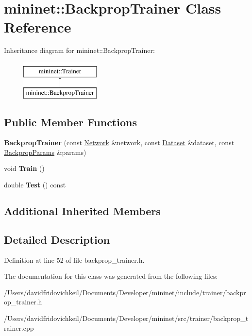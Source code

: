 \hypertarget{classmininet_1_1_backprop_trainer}{}\section{mininet\+:\+:Backprop\+Trainer Class Reference}
\label{classmininet_1_1_backprop_trainer}
Inheritance diagram for mininet\+:\+:Backprop\+Trainer\+:\begin{figure}[H]
\begin{center}
\leavevmode
\includegraphics[height=2.000000cm]{classmininet_1_1_backprop_trainer}
\end{center}
\end{figure}
\subsection*{Public Member Functions}
\begin{DoxyCompactItemize}
\item 
\hypertarget{classmininet_1_1_backprop_trainer_a8cbf43d95c557921f1240b89e44b2da8}{}\label{classmininet_1_1_backprop_trainer_a8cbf43d95c557921f1240b89e44b2da8} 
{\bfseries Backprop\+Trainer} (const \hyperlink{classmininet_1_1_network}{Network} \&network, const \hyperlink{classmininet_1_1_dataset}{Dataset} \&dataset, const \hyperlink{structmininet_1_1_backprop_params}{Backprop\+Params} \&params)
\item 
\hypertarget{classmininet_1_1_backprop_trainer_a019cf7d0c8c26483e17a40c44474f21d}{}\label{classmininet_1_1_backprop_trainer_a019cf7d0c8c26483e17a40c44474f21d} 
void {\bfseries Train} ()
\item 
\hypertarget{classmininet_1_1_backprop_trainer_ae4fae1037d977eadad70f6b5f5f39f90}{}\label{classmininet_1_1_backprop_trainer_ae4fae1037d977eadad70f6b5f5f39f90} 
double {\bfseries Test} () const
\end{DoxyCompactItemize}
\subsection*{Additional Inherited Members}


\subsection{Detailed Description}


Definition at line 52 of file backprop\+\_\+trainer.\+h.



The documentation for this class was generated from the following files\+:\begin{DoxyCompactItemize}
\item 
/\+Users/davidfridovichkeil/\+Documents/\+Developer/mininet/include/trainer/backprop\+\_\+trainer.\+h\item 
/\+Users/davidfridovichkeil/\+Documents/\+Developer/mininet/src/trainer/backprop\+\_\+trainer.\+cpp\end{DoxyCompactItemize}
